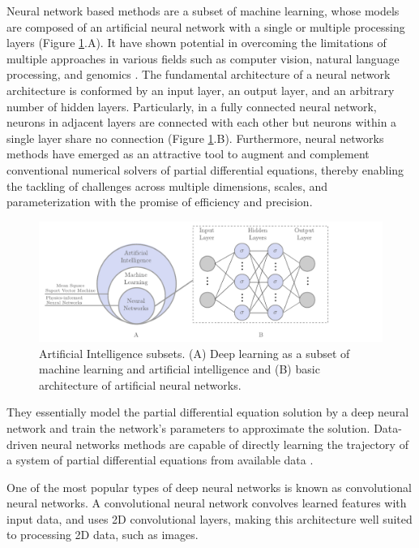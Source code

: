 \documentclass[11pt,twoside]{article}
\begin{document}
Neural network based methods are a subset of machine learning, whose models are composed of an artificial neural 
network with a single or multiple processing layers (Figure \ref{deep_learning_subset_architecture}.A). It have 
shown potential in overcoming the limitations of multiple approaches in various fields such as computer vision, 
natural language processing, and genomics \citep{lecun_deep_2015,goodfellow_deep_2016}. The fundamental architecture 
of a neural network architecture is conformed by an input layer, an output layer, and an arbitrary number of hidden 
layers. Particularly, in a fully connected neural network, neurons in adjacent layers are connected with each other 
but neurons within a single layer share no connection (Figure \ref{deep_learning_subset_architecture}.B). Furthermore, 
neural networks methods have emerged as an attractive tool to augment and complement conventional numerical solvers 
of partial differential equations, thereby enabling the tackling of challenges across multiple dimensions, scales, 
and parameterization with the promise of efficiency and precision. 

\begin{figure}[h]
\centering
    \includegraphics[width=1.0\textwidth]{figs/artificial_intelligence_subsets.pdf}
    \caption{Artificial Intelligence subsets. (A) Deep learning as a subset of machine learning and artificial 
    intelligence and (B) basic architecture of artificial neural networks.}    
    \label{deep_learning_subset_architecture}
\end{figure}

They essentially model the partial differential equation solution by a deep neural network and train the 
network’s parameters to approximate the solution. Data-driven neural networks methods are capable of directly 
learning the trajectory of a system of partial differential equations from available data 
\citep{li_neural_2020,li_fourier_2021}.

One of the most popular types of deep neural networks is known as convolutional neural networks. A 
convolutional neural network convolves learned features with input data, and uses 2D convolutional 
layers, making this architecture well suited to processing 2D data, such as images.
\end{document}
